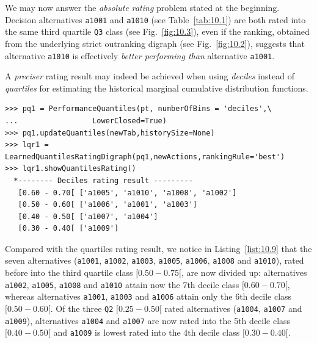 We may now answer the \emph{absolute rating} problem stated at the beginning. Decision alternatives \texttt{a1001} and \texttt{a1010} (see Table~\ref{tab:10.1}) are both rated into the same third quartile \texttt{Q3} class (see Fig.~\ref{fig:10.3}), even if the \Copeland ranking, obtained from the underlying strict outranking digraph (see Fig.~\ref{fig:10.2}), suggests that alternative \texttt{a1010} is effectively \emph{better performing than} alternative \texttt{a1001}. 

A \emph{preciser} rating result may indeed be achieved when using \emph{deciles} instead of \emph{quartiles} for estimating the historical marginal cumulative distribution functions.
\begin{lstlisting}[caption={Absolute deciles rating result},label=list:10.9]
>>> pq1 = PerformanceQuantiles(pt, numberOfBins = 'deciles',\
...                 LowerClosed=True)
>>> pq1.updateQuantiles(newTab,historySize=None)
>>> lqr1 = LearnedQuantilesRatingDigraph(pq1,newActions,rankingRule='best')
>>> lqr1.showQuantilesRating()
  *-------- Deciles rating result ---------
   [0.60 - 0.70[ ['a1005', 'a1010', 'a1008', 'a1002']
   [0.50 - 0.60[ ['a1006', 'a1001', 'a1003']
   [0.40 - 0.50[ ['a1007', 'a1004']
   [0.30 - 0.40[ ['a1009']
\end{lstlisting}
Compared with the quartiles rating result, we notice in Listing~\ref{list:10.9} that the seven alternatives (\texttt{a1001}, \texttt{a1002}, \texttt{a1003}, \texttt{a1005}, \texttt{a1006}, \texttt{a1008} and \texttt{a1010}), rated before into the third quartile class $[0.50-0.75[$, are now divided up: alternatives \texttt{a1002}, \texttt{a1005}, \texttt{a1008} and \texttt{a1010} attain now the 7th decile class $[0.60-0.70[$, whereas alternatives \texttt{a1001}, \texttt{a1003} and \texttt{a1006} attain only the 6th decile class $[0.50-0.60[$. Of the three \texttt{Q2} $[0.25-0.50[$ rated alternatives (\texttt{a1004}, \texttt{a1007} and \texttt{a1009}), alternatives \texttt{a1004} and \texttt{a1007} are now rated into the 5th decile class $[0.40-0.50[$ and \texttt{a1009} is lowest rated into the 4th decile class $[0.30-0.40[$.

